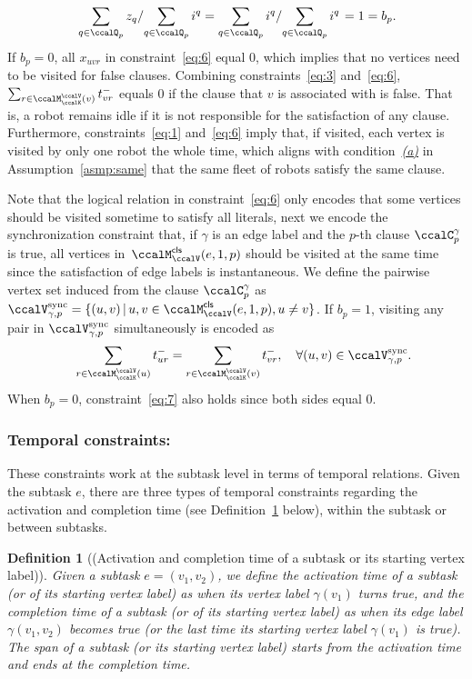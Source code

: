 \documentclass[Afour,sageh,times]{sagej}
\newtheorem{defn}[thm]{Definition}
\begin{document}
{{{{{  \begin{align*}
   \left. \sum_{q\in \ccalQ_p} z_q \small/ {\sum_{q\in \ccalQ_p} i^q} = {\sum_{q\in \ccalQ_p} i^q} \small/{\sum_{q\in \ccalQ_p} i^q} \right. = 1 = b_p.
  \end{align*}
If $b_p=0$, all $x_{uvr}$ in constraint~\eqref{eq:6} equal 0, which implies that no vertices need to be visited for false clauses. Combining constraints~\eqref{eq:3} and~\eqref{eq:6}, $\sum_{r\in \ccalM^\ccalV_{\ccalK}(v)} t^-_{vr}$ equals 0 if the  clause that $v$ is associated with is false. That is, a robot remains idle if it is not responsible for the satisfaction of any clause. Furthermore, constraints~\eqref{eq:1} and~\eqref{eq:6} imply that, if visited, each vertex is visited by only one robot the whole time, which aligns with condition~\hyperref[asmp:a]{\it (a)} in Assumption~\ref{asmp:same} that the same fleet of robots satisfy the same clause.

    Note that the logical relation in constraint~\eqref{eq:6} only encodes that some vertices should be visited sometime to satisfy all literals, next we encode the synchronization constraint that, if $\gamma$ is an edge label and  the $p$-th clause $\ccalC_p^\gamma$ is true, all vertices in~$\ccalM^\mathsf{cls}_\ccalV(e, 1,p)$ should be visited at the same time since the satisfaction of edge labels is instantaneous.
      We define the pairwise vertex set induced from the clause $\ccalC_p^\gamma$ as  $\ccalV_{\gamma, p}^{\text{sync}} = \{(u,v)\,|\, u, v\in \ccalM^\mathsf{cls}_\ccalV(e,1,p), u\not= v \}$. If $b_p=1$, visiting any pair in $\ccalV_{\gamma, p}^{\text{sync}}$ simultaneously is encoded as
\begin{align}
  & \quad\quad  \sum_{r\in \ccalM^\ccalV_{\ccalK}(u)} t_{ur}^-  = \sum_{r\in \ccalM^\ccalV_{\ccalK}(v)} t_{vr}^- , \quad\forall (u,v) \in \ccalV_{\gamma, p}^{\text{sync}}.\label{eq:7}
\end{align}
When $b_p=0$, constraint~\eqref{eq:7} also holds since both sides equal 0.




\subsubsection{Temporal constraints:}\label{sec:temporal} These constraints work at the subtask level in terms of temporal relations. Given the subtask $e$, there are three types of temporal constraints regarding the activation and completion time (see Definition~\ref{defn:time} below),  within the subtask or between subtasks.
\begin{defn}[(Activation and completion time of a subtask or its starting vertex label)]\label{defn:time}
Given a subtask $e = (v_1, v_2)$, we define the  activation time of a subtask (or of its starting  vertex label) as when its vertex label $\gamma(v_1)$ turns true, and the completion time  of a subtask (or of its starting vertex label) as when its edge label $\gamma(v_1, v_2)$ becomes true (or the last time its starting vertex label $\gamma(v_1)$ is true). The span of a subtask (or its starting vertex label) starts from the activation time and ends at the completion time.
\end{defn}
}}}}}
\end{document}
